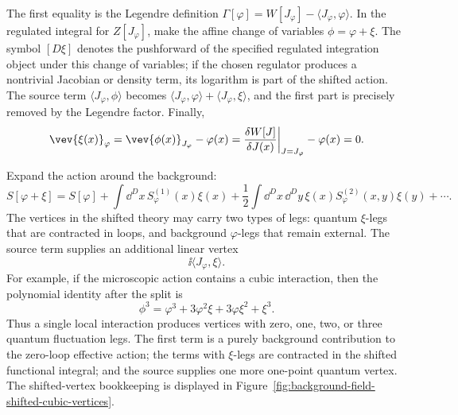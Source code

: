 The first equality is the Legendre definition
\(\Gamma[\varphi]=W[J_\varphi]-\langle J_\varphi,\varphi\rangle\).  In the
regulated integral for \(Z[J_\varphi]\), make the affine change of variables
\(\phi=\varphi+\xi\).  The symbol \([D\xi]\) denotes the pushforward of the
specified regulated integration object under this change of variables; if the
chosen regulator produces a nontrivial Jacobian or density term, its logarithm
is part of the shifted action.  The source term
\(\langle J_\varphi,\phi\rangle\) becomes
\(\langle J_\varphi,\varphi\rangle+\langle J_\varphi,\xi\rangle\), and the
first part is precisely removed by the Legendre factor.  Finally,
\[
  \vev{\xi(x)}_{\varphi}
  =
  \vev{\phi(x)}_{J_\varphi}-\varphi(x)
  =
  \frac{\delta W[J]}{\delta J(x)}\bigg|_{J=J_\varphi}-\varphi(x)
  =
  0 .
\]

Expand the action around the background:
\[
  S[\varphi+\xi]
  =
  S[\varphi]
  +
  \int \dd^Dx\,S^{(1)}_{\varphi}(x)\xi(x)
  +
  \frac12
  \int \dd^Dx\,\dd^Dy\,
  \xi(x)S^{(2)}_{\varphi}(x,y)\xi(y)
  +\cdots .
\]
The vertices in the shifted theory may carry two types of legs: quantum
\(\xi\)-legs that are contracted in loops, and background
\(\varphi\)-legs that remain external.  The source term supplies an additional
linear vertex
\[
  \ii\langle J_{\varphi},\xi\rangle .
\]
For example, if the microscopic action contains a cubic interaction, then
the polynomial identity after the split is
\[
  \phi^3
  =
  \varphi^3+3\varphi^2\xi
  +3\varphi\xi^2+\xi^3 .
\]
Thus a single local interaction produces vertices with zero, one, two, or
three quantum fluctuation legs.  The first term is a purely background
contribution to the zero-loop effective action; the terms with
\(\xi\)-legs are contracted in the shifted functional integral; and
the source supplies one more one-point quantum vertex.  The shifted-vertex
bookkeeping is displayed in Figure~\ref{fig:background-field-shifted-cubic-vertices}.
